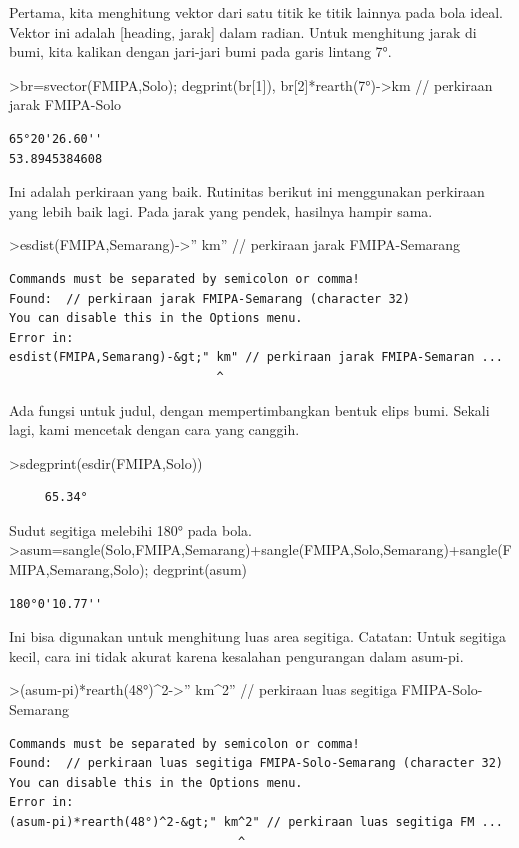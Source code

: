 \documentclass[
]{book}
\begin{document}
Pertama, kita menghitung vektor dari satu titik ke titik lainnya pada bola ideal. Vektor ini adalah {[}heading, jarak{]} dalam radian. Untuk menghitung jarak di bumi, kita kalikan dengan jari-jari bumi pada garis lintang 7°.

\textgreater br=svector(FMIPA,Solo); degprint(br{[}1{]}), br{[}2{]}*rearth(7°)-\textgreater km // perkiraan jarak FMIPA-Solo

\begin{verbatim}
65°20'26.60''
53.8945384608
\end{verbatim}

Ini adalah perkiraan yang baik. Rutinitas berikut ini menggunakan perkiraan yang lebih baik lagi. Pada jarak yang pendek, hasilnya hampir sama.

\textgreater esdist(FMIPA,Semarang)-\textgreater'' km'' // perkiraan jarak FMIPA-Semarang

\begin{verbatim}
Commands must be separated by semicolon or comma!
Found:  // perkiraan jarak FMIPA-Semarang (character 32)
You can disable this in the Options menu.
Error in:
esdist(FMIPA,Semarang)-&gt;" km" // perkiraan jarak FMIPA-Semaran ...
                             ^
\end{verbatim}

Ada fungsi untuk judul, dengan mempertimbangkan bentuk elips bumi. Sekali lagi, kami mencetak dengan cara yang canggih.

\textgreater sdegprint(esdir(FMIPA,Solo))

\begin{verbatim}
     65.34°
\end{verbatim}

Sudut segitiga melebihi 180° pada bola. \textgreater asum=sangle(Solo,FMIPA,Semarang)+sangle(FMIPA,Solo,Semarang)+sangle(FMIPA,Semarang,Solo); degprint(asum)

\begin{verbatim}
180°0'10.77''
\end{verbatim}

Ini bisa digunakan untuk menghitung luas area segitiga. Catatan: Untuk segitiga kecil, cara ini tidak akurat karena kesalahan pengurangan dalam asum-pi.

\textgreater(asum-pi)*rearth(48°)\^{}2-\textgreater'' km\^{}2'' // perkiraan luas segitiga FMIPA-Solo-Semarang

\begin{verbatim}
Commands must be separated by semicolon or comma!
Found:  // perkiraan luas segitiga FMIPA-Solo-Semarang (character 32)
You can disable this in the Options menu.
Error in:
(asum-pi)*rearth(48°)^2-&gt;" km^2" // perkiraan luas segitiga FM ...
                                ^
\end{verbatim}
\end{document}
